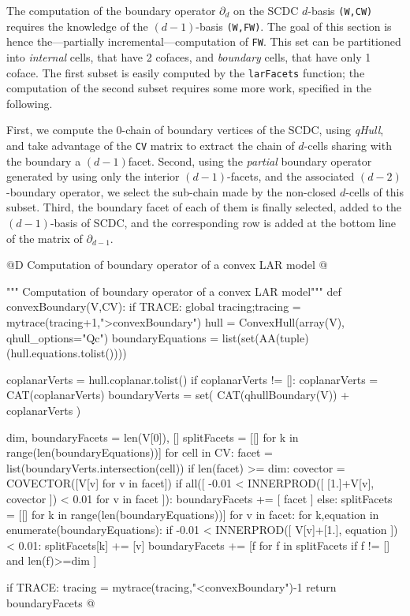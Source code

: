 \documentclass[11pt,oneside]{article}	%
\begin{document}
The computation of the boundary operator $\partial_d$ on the SCDC $d$-basis \texttt{(W,CW)} requires the knowledge of the $(d-1)$-basis \texttt{(W,FW)}. The goal of this section is hence the---partially incremental---computation of \texttt{FW}. This set can be partitioned into \emph{internal} cells, that have 2 cofaces, and \emph{boundary} cells, that have only 1 coface. The first subset is easily computed by the \texttt{larFacets} function; the computation of the second subset requires some more work, specified in the following.

First, we compute the 0-chain of boundary vertices of the SCDC, using \emph{qHull}, and take advantage of the \texttt{CV} matrix to extract the chain of $d$-cells sharing with the boundary a $(d-1)$facet. Second, using the \emph{partial} boundary operator generated by using only the interior $(d-1)$-facets, and the associated $(d-2)$-boundary operator, we select the sub-chain made by the non-closed $d$-cells of this subset. Third, the boundary facet of each of them is finally selected, added to the $(d-1)$-basis of SCDC, and the corresponding row is added at the bottom line of the matrix of $\partial_{d-1}$.

@D Computation of boundary operator of a convex LAR model
@{""" Computation of boundary operator of a convex LAR model"""
def convexBoundary(V,CV): 
	if TRACE: global tracing;tracing = mytrace(tracing+1,">convexBoundary")
	hull = ConvexHull(array(V), qhull_options="Qc")
	boundaryEquations = list(set(AA(tuple)(hull.equations.tolist())))
	
	coplanarVerts = hull.coplanar.tolist()
	if coplanarVerts != []:  coplanarVerts = CAT(coplanarVerts)
	boundaryVerts = set( CAT(qhullBoundary(V)) + coplanarVerts )
	
	dim, boundaryFacets = len(V[0]), []
	splitFacets = [[] for k in range(len(boundaryEquations))]
	for cell in CV:
		facet = list(boundaryVerts.intersection(cell))
		if len(facet) >= dim:
			covector = COVECTOR([V[v] for v in facet])
			if all([ -0.01 < INNERPROD([ [1.]+V[v], covector ]) < 0.01 for v in facet ]):
				boundaryFacets += [ facet ]
			else:
				splitFacets = [[] for k in range(len(boundaryEquations))]
				for v in facet:
					for k,equation in enumerate(boundaryEquations):
						if -0.01 < INNERPROD([ V[v]+[1.], equation ]) < 0.01:
							splitFacets[k] += [v]
			boundaryFacets += [f for f in splitFacets if f != [] and len(f)>=dim ]

	if TRACE: tracing = mytrace(tracing,"<convexBoundary")-1
	return boundaryFacets
@}
\end{document}
